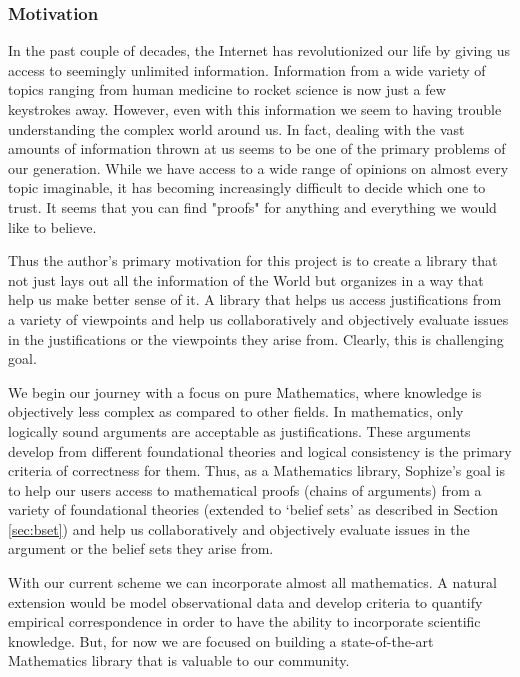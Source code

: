 \documentclass[a4paper]{article}
\begin{document}
\subsubsection*{Motivation}

In the past couple of decades, the Internet has revolutionized our life by giving us access to seemingly unlimited information. Information from a wide variety of topics ranging from human medicine to rocket science is now just a few keystrokes away. However, even with this information we seem to having trouble understanding the complex world around us. In fact, dealing with the vast amounts of information thrown at us seems to be one of the primary problems of our generation. While we have access to a wide range of opinions on almost every topic imaginable, it has becoming increasingly difficult to decide which one to trust. It seems that you can find "proofs" for anything and everything we would like to believe.

Thus the author's primary motivation for this project is to create a library that not just lays out all the information of the World but organizes in a way that help us make better sense of it. A library that helps us access justifications from a variety of viewpoints and help us collaboratively and objectively evaluate issues in the justifications or the viewpoints they arise from. Clearly, this is challenging goal. 

We begin our journey with a focus on pure Mathematics, where knowledge is objectively less complex as compared to other fields. In mathematics, only logically sound arguments are acceptable as justifications. These arguments develop from different foundational theories and logical consistency is the primary criteria of correctness for them. Thus, as a Mathematics library, Sophize's goal is to help our users access to mathematical proofs (chains of arguments) from a variety of foundational theories (extended to `belief sets' as described in Section \ref{sec:bset}) and help us collaboratively and objectively evaluate issues in the argument or the belief sets they arise from.

With our current scheme we can incorporate almost all mathematics. A natural extension would be model observational data and develop criteria to quantify empirical correspondence in order to have the ability to incorporate scientific knowledge. But, for now we are focused on building a state-of-the-art Mathematics library that is valuable to our community.
\end{document}
